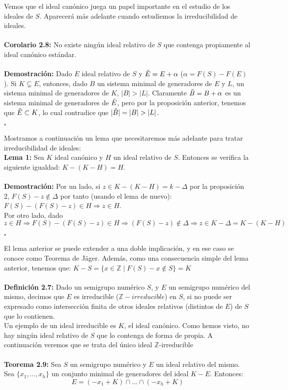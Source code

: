 \documentclass[11pt,spanish]{book}
\newcommand{\qed}{\begin{flushright} $\square$ \end{flushright}}
\begin{document}
Vemos que el ideal canónico juega un papel importante en el estudio de los ideales de $S$. Aparecerá más adelante cuando estudiemos la irreducibilidad de ideales.\\
\\ \textbf{Corolario 2.8:} No existe ningún ideal relativo de $S$ que contenga propiamente al ideal canónico estándar.\\
\\ \textbf{Demostración:} Dado $E$ ideal relativo de $S$ y $\Tilde{E}=E+\alpha$ ($\alpha = F(S)-F(E)$). Si $K\subsetneq E$, entonces, dado $B$ un sistema minimal de generadores de $E$ y $L$, un sistema minimal de generadores de $K$, $|B|>|L|$. Claramente $\Tilde{B}=B+\alpha$ es un sistema minimal de generadores de $\Tilde{E}$, pero por la proposición anterior, tenemos que $\Tilde{E}\subset K$, lo cual contradice que $|\Tilde{B}|=|B|>|L|$.
\qed

Mostramos a continuación un lema que necesitaremos más adelante para tratar irreducibilidad de ideales:
\\ \textbf{Lema 1: } Sea $K$ ideal canónico y $H$ un ideal relativo de $S$. Entonces se verifica la siguiente igualdad: $K-(K-H)=H$.\\
\\ \textbf{Demostración:} Por un lado, si $z\in K-(K-H) = k-\Delta$ por la proposición 2, $F(S)-z\notin \Delta$ por tanto (usando el lema de nuevo): $F(S)-(F(S)-z)\in H\Rightarrow z\in H$.\\
Por otro lado, dado $z\in H\Rightarrow F(S)-(F(S)-z)\in H\Rightarrow  (F(S)-z)\notin \Delta \Rightarrow  z\in K-\Delta = K-(K-H)$
\qed

El lema anterior se puede extender a una doble implicación, y en ese caso se conoce como Teorema de Jäger. Además, como una consecuencia simple del lema anterior, tenemos que: $K-S=\{x\in\mathbb{Z}\;|\;F(S)-x\notin S\} = K$\\
\\ \textbf{ Definición 2.7: } Dado un semigrupo numérico $S$, y $E$ un semigrupo numérico del mismo, decimos que $E$ es irreducible ($\mathbb{Z}-irreducible$) en $S$, si no  puede ser expresado como intersección finita de otros ideales relativos (distintos de $E$) de $S$ que lo contienen.\\

Un ejemplo de un ideal irreducible es $K$, el ideal canónico. Como hemos visto, no hay ningún ideal relativo de $S$ que lo contenga de forma de propia. A continuación veremos que se trata del único ideal $\mathbb{Z}$-irreducible\\
\\ \textbf{Teorema 2.9: } Sea $S$ un semigrupo numérico y $E$ un ideal relativo del mismo. Sea $\{x_{1},\ldots,x_{h}\}$ un conjunto minimal de generadores del ideal $K-E$. Entonces:
$$E = (-x_{1}+K)\cap \ldots \cap (-x_{h}+K)$$\\
\end{document}
